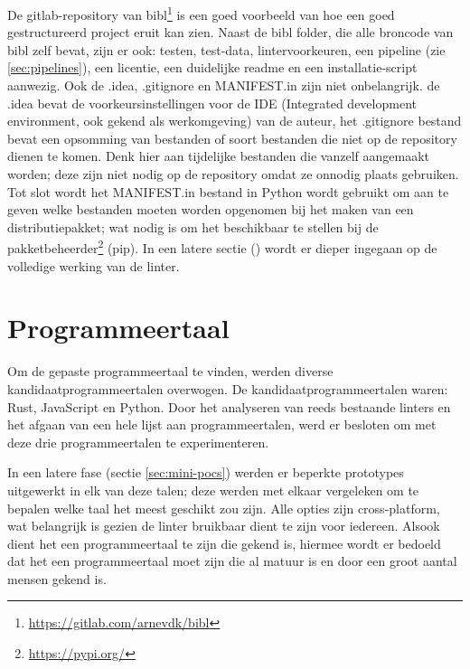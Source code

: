De gitlab-repository van bibl\footnote{\url{https://gitlab.com/arnevdk/bibl}} is een goed voorbeeld van hoe een goed gestructureerd project eruit kan zien. Naast de bibl folder, die alle broncode van bibl zelf bevat, zijn er ook: testen, test-data, lintervoorkeuren, een pipeline (zie \ref{sec:pipelines}), een licentie, een duidelijke readme en een installatie-script aanwezig. Ook de .idea, .gitignore en MANIFEST.in zijn niet onbelangrijk. de .idea bevat de voorkeursinstellingen voor de IDE (Integrated development environment, ook gekend als werkomgeving) van de auteur, het .gitignore bestand bevat een opsomming van bestanden of soort bestanden die niet op de repository dienen te komen. Denk hier aan tijdelijke bestanden die vanzelf aangemaakt worden; deze zijn niet nodig op de repository omdat ze onnodig plaats gebruiken. Tot slot wordt het MANIFEST.in bestand in Python wordt gebruikt om aan te geven welke bestanden moeten worden opgenomen bij het maken van een distributiepakket; wat nodig is om het beschikbaar te stellen bij de pakketbeheerder\footnote{\url{https://pypi.org/}} (pip). In een latere sectie () wordt er dieper ingegaan op de volledige werking van de linter.
\section{Programmeertaal}

Om de gepaste programmeertaal te vinden, werden diverse kandidaatprogrammeertalen overwogen. De kandidaatprogrammeertalen waren: Rust, JavaScript en Python. Door het analyseren van reeds bestaande linters en het afgaan van een hele lijst aan programmeertalen, werd er besloten om met deze drie programmeertalen te experimenteren.

In een latere fase (sectie \ref{sec:mini-pocs}) werden er beperkte prototypes uitgewerkt in elk van deze talen; deze werden met elkaar vergeleken om te bepalen welke taal het meest geschikt zou zijn. Alle opties zijn cross-platform, wat belangrijk is gezien de linter bruikbaar dient te zijn voor iedereen. Alsook dient het een programmeertaal te zijn die gekend is, hiermee wordt er bedoeld dat het een programmeertaal moet zijn die al matuur is en door een groot aantal mensen gekend is.

